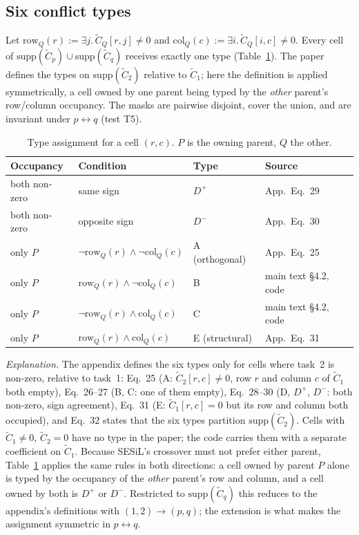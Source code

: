 \documentclass[11pt,a4paper]{article}
\newcommand{\Ct}{\tilde{C}}
\newcommand{\Dp}{D^{+}}
\newcommand{\Dm}{D^{-}}
\begin{document}
\subsection{Six conflict types}
\label{sec:types}
Let $\mathrm{row}_Q(r)\!:=\!\exists j.\,\Ct_Q[r,j]\neq 0$ and $\mathrm{col}_Q(c)\!:=\!\exists i.\,\Ct_Q[i,c]\neq 0$. Every cell of $\mathrm{supp}(\Ct_p)\cup\mathrm{supp}(\Ct_q)$ receives exactly one type (Table~\ref{tab:types}). The paper defines the types on $\mathrm{supp}(\Ct_2)$ relative to $\Ct_1$; here the definition is applied symmetrically, a cell owned by one parent being typed by the \emph{other} parent's row/column occupancy. The masks are pairwise disjoint, cover the union, and are invariant under $p\leftrightarrow q$ (test T5).

\begin{table}[h]
\centering\small
\caption{Type assignment for a cell $(r,c)$. $P$ is the owning parent, $Q$ the other.}
\label{tab:types}
\begin{tabular}{llll}
\toprule
Occupancy & Condition & Type & Source \\
\midrule
both non-zero & same sign & $\Dp$ & App.\ Eq.~29 \\
both non-zero & opposite sign & $\Dm$ & App.\ Eq.~30 \\
only $P$ & $\neg\mathrm{row}_Q(r)\wedge\neg\mathrm{col}_Q(c)$ & A (orthogonal) & App.\ Eq.~25 \\
only $P$ & $\mathrm{row}_Q(r)\wedge\neg\mathrm{col}_Q(c)$ & B & main text \S4.2, code \\
only $P$ & $\neg\mathrm{row}_Q(r)\wedge\mathrm{col}_Q(c)$ & C & main text \S4.2, code \\
only $P$ & $\mathrm{row}_Q(r)\wedge\mathrm{col}_Q(c)$ & E (structural) & App.\ Eq.~31 \\
\bottomrule
\end{tabular}
\end{table}

\emph{Explanation.} The appendix defines the six types only for cells where task~2 is non-zero, relative to task~1: Eq.~25 (A: $\Ct_2[r,c]\neq0$, row $r$ and column $c$ of $\Ct_1$ both empty), Eq.~26--27 (B, C: one of them empty), Eq.~28--30 (D, $\Dp$, $\Dm$: both non-zero, sign agreement), Eq.~31 (E: $\Ct_1[r,c]=0$ but its row and column both occupied), and Eq.~32 states that the six types partition $\mathrm{supp}(\Ct_2)$. Cells with $\Ct_1\neq0$, $\Ct_2=0$ have no type in the paper; the code carries them with a separate coefficient on $\Ct_1$. Because SESiL's crossover must not prefer either parent, Table~\ref{tab:types} applies the same rules in both directions: a cell owned by parent $P$ alone is typed by the occupancy of the \emph{other} parent's row and column, and a cell owned by both is $\Dp$ or $\Dm$. Restricted to $\mathrm{supp}(\Ct_q)$ this reduces to the appendix's definitions with $(1,2)\to(p,q)$; the extension is what makes the assignment symmetric in $p\leftrightarrow q$.
\end{document}
